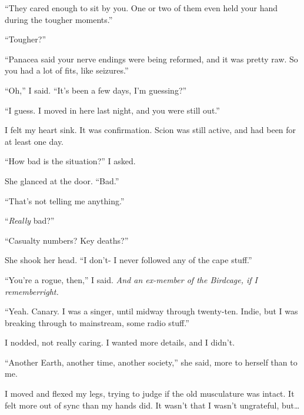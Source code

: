 ``They cared enough to sit by you.  One or two of them even held your hand during the tougher moments.''



``Tougher?''



``Panacea said your nerve endings were being reformed, and it was pretty raw.  So you had a lot of fits, like seizures.''



``Oh,'' I said.  ``It's been a few days, I'm guessing?''



``I guess.  I moved in here last night, and you were still out.''



I felt my heart sink.  It was confirmation.  Scion was still active, and had been for at least one day.



``How bad is the situation?'' I asked.



She glanced at the door.  ``Bad.''



``That's not telling me anything.''



``\emph{Really} bad?''



``Casualty numbers?  Key deaths?''



She shook her head.  ``I don't- I never followed any of the cape stuff.''



``You're a rogue, then,'' I said.  \emph{And an ex-member of the Birdcage, if I remember}\emph{right.}



``Yeah.  Canary.  I was a singer, until midway through twenty-ten.  Indie, but I was breaking through to mainstream, some radio stuff.''



I nodded, not really caring.  I wanted more details, and I didn't.



``Another Earth, another time, another society,'' she said, more to herself than to me.



I moved and flexed my legs, trying to judge if the old musculature was intact.  It felt more out of sync than my hands did.  It wasn't that I wasn't ungrateful, but\ldots



